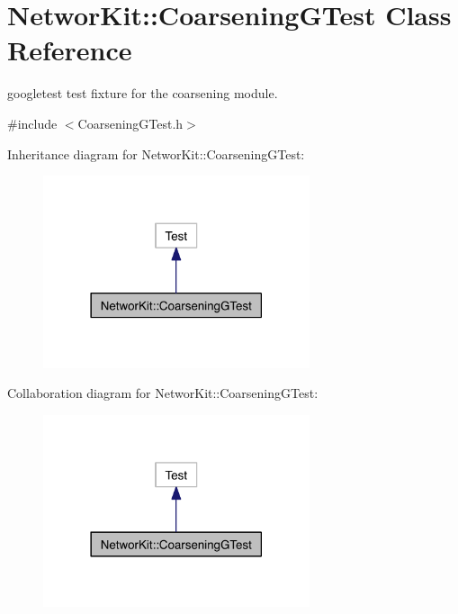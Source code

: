 \hypertarget{class_networ_kit_1_1_coarsening_g_test}{\section{Networ\-Kit\-:\-:Coarsening\-G\-Test Class Reference}
\label{class_networ_kit_1_1_coarsening_g_test}
}


googletest test fixture for the coarsening module.  




{\ttfamily \#include $<$Coarsening\-G\-Test.\-h$>$}



Inheritance diagram for Networ\-Kit\-:\-:Coarsening\-G\-Test\-:\nopagebreak
\begin{figure}[H]
\begin{center}
\leavevmode
\includegraphics[width=222pt]{class_networ_kit_1_1_coarsening_g_test__inherit__graph}
\end{center}
\end{figure}


Collaboration diagram for Networ\-Kit\-:\-:Coarsening\-G\-Test\-:\nopagebreak
\begin{figure}[H]
\begin{center}
\leavevmode
\includegraphics[width=222pt]{class_networ_kit_1_1_coarsening_g_test__coll__graph}
\end{center}
\end{figure}


